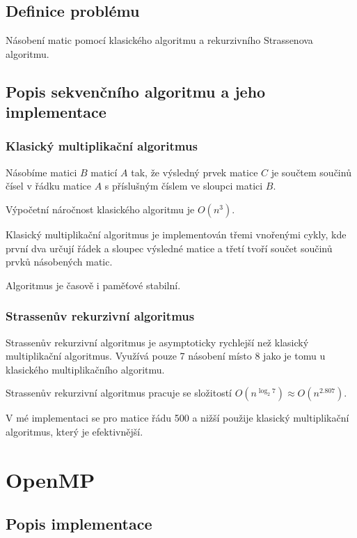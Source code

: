 \documentclass[12pt,a4paper]{article}
\begin{document}
\subsection{Definice problému}

Násobení matic pomocí klasického algoritmu a rekurzivního Strassenova algoritmu.

\subsection{Popis sekvenčního algoritmu a jeho implementace}

\subsubsection{Klasický multiplikační algoritmus}
Násobíme matici $B$ maticí $A$ tak, že výsledný prvek matice $C$ je součtem součinů čísel v řádku matice $A$ s příslušným číslem ve sloupci matici $B$.

\bigskip
Výpočetní náročnost klasického algoritmu je $O(n^3)$.

\bigskip
Klasický multiplikační algoritmus je implementován třemi vnořenými cykly, kde první dva určují řádek a sloupec výsledné matice a třetí tvoří součet součinů prvků násobených matic.

\bigskip
Algoritmus je časově i paměťové stabilní.

\subsubsection{Strassenův rekurzivní algoritmus}

Strassenův rekurzivní algoritmus je asymptoticky rychlejší než klasický multiplikační algoritmus. Využívá pouze 7 násobení místo 8 jako je tomu u klasického multiplikačního algoritmu.

\bigskip
Strassenův rekurzivní algoritmus pracuje se složitostí $O(n^{\log_2{7}}) \approx O(n^{2.807})$. 

\bigskip
V mé implementaci se pro matice řádu 500 a nižší použije klasický multiplikační algoritmus, který je efektivnější.


\section{OpenMP}
\subsection{Popis implementace}
\end{document}
